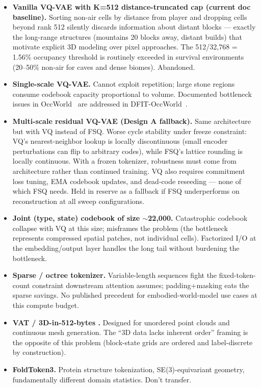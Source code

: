 \documentclass[11pt,a4paper]{article}
\begin{document}
\begin{itemize}
  \item \textbf{Vanilla VQ-VAE \citep{vqvae,occworld} with K=512 distance-truncated cap (current doc baseline).} Sorting non-air cells by distance from player and dropping cells beyond rank 512 silently discards information about distant blocks --- exactly the long-range structures (mountains 20 blocks away, distant builds) that motivate explicit 3D modeling over pixel approaches. The 512/32{,}768 = 1.56\% occupancy threshold is routinely exceeded in survival environments (20--50\% non-air for caves and dense biomes). Abandoned.

  \item \textbf{Single-scale VQ-VAE.} Cannot exploit repetition; large stone regions consume codebook capacity proportional to volume. Documented bottleneck issues in OccWorld~\cite{occworld} are addressed in DFIT-OccWorld~\cite{dfitocc}.

  \item \textbf{Multi-scale residual VQ-VAE (Design A fallback).} Same architecture but with VQ instead of FSQ. Worse cycle stability under freeze constraint: VQ's nearest-neighbor lookup is locally discontinuous (small encoder perturbations can flip to arbitrary codes), while FSQ's lattice rounding is locally continuous. With a frozen tokenizer, robustness must come from architecture rather than continued training. VQ also requires commitment loss tuning, EMA codebook updates, and dead-code reseeding --- none of which FSQ needs. Held in reserve as a fallback if FSQ underperforms on reconstruction at all sweep configurations.

  \item \textbf{Joint (type, state) codebook of size $\sim$22{,}000.} Catastrophic codebook collapse with VQ at this size; misframes the problem (the bottleneck represents compressed spatial patches, not individual cells). Factorized I/O at the embedding/output layer handles the long tail without burdening the bottleneck.

  \item \textbf{Sparse / octree tokenizer.} Variable-length sequences fight the fixed-token-count constraint downstream attention assumes; padding+masking eats the sparse savings. No published precedent for embodied-world-model use cases at this compute budget.

  \item \textbf{VAT / 3D-in-512-bytes \citep{vat}.} Designed for unordered point clouds and continuous mesh generation. The ``3D data lacks inherent order'' framing is the opposite of this problem (block-state grids are ordered and label-discrete by construction).

  \item \textbf{FoldToken3.} Protein structure tokenization, SE(3)-equivariant geometry, fundamentally different domain statistics. Don't transfer.
\end{itemize}
\end{document}
